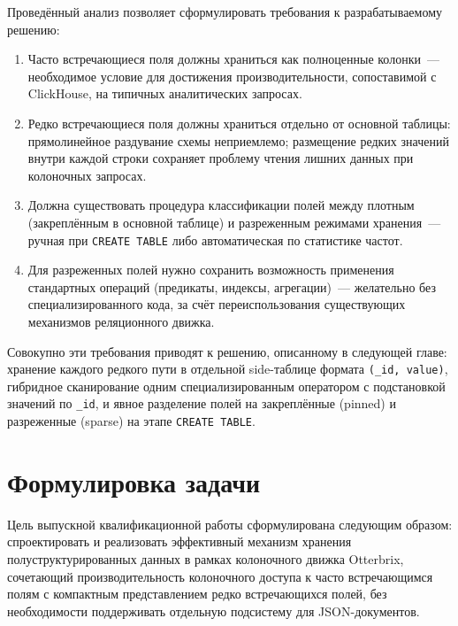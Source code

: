 Проведённый анализ позволяет сформулировать требования к
разрабатываемому решению:
\begin{enumerate}
    \item Часто встречающиеся поля должны храниться как полноценные
    колонки~--- необходимое условие для достижения
    производительности, сопоставимой с ClickHouse, на типичных
    аналитических запросах.
    \item Редко встречающиеся поля должны храниться отдельно от
    основной таблицы: прямолинейное раздувание схемы неприемлемо;
    размещение редких значений внутри каждой строки сохраняет
    проблему чтения лишних данных при колоночных запросах.
    \item Должна существовать процедура классификации полей между
    плотным (закреплённым в основной таблице) и разреженным режимами
    хранения~--- ручная при \texttt{CREATE TABLE} либо
    автоматическая по статистике частот.
    \item Для разреженных полей нужно сохранить возможность
    применения стандартных операций (предикаты, индексы,
    агрегации)~--- желательно без специализированного кода, за
    счёт переиспользования существующих механизмов реляционного
    движка.
\end{enumerate}

Совокупно эти требования приводят к решению, описанному в
следующей главе: хранение каждого редкого пути в отдельной
side-таблице формата \texttt{(\_id, value)}, гибридное сканирование
одним специализированным оператором с подстановкой значений по
\texttt{\_id}, и явное разделение полей на закреплённые (pinned)
и разреженные (sparse) на этапе \texttt{CREATE TABLE}.

\finishrelatedwork

\section{Формулировка задачи}

Цель выпускной квалификационной работы сформулирована следующим
образом: спроектировать и реализовать эффективный механизм
хранения полуструктурированных данных в рамках колоночного
движка Otterbrix, сочетающий производительность колоночного
доступа к часто встречающимся полям с компактным представлением
редко встречающихся полей, без необходимости поддерживать
отдельную подсистему для JSON-документов.

